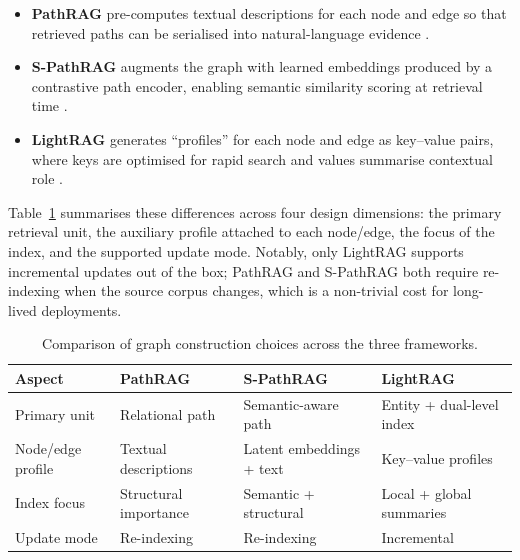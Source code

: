 \documentclass[12pt,a4paper,oneside]{report}
\begin{document}
\begin{itemize}[leftmargin=2em,itemsep=2pt]
    \item \textbf{PathRAG} pre-computes textual descriptions for each node
          and edge so that retrieved paths can be serialised into
          natural-language evidence \citep{chen2025pathrag}.
    \item \textbf{S-PathRAG} augments the graph with learned embeddings
          produced by a contrastive path encoder, enabling semantic
          similarity scoring at retrieval time \citep{fu2026spathrag}.
    \item \textbf{LightRAG} generates ``profiles'' for each node and edge as
          key--value pairs, where keys are optimised for rapid search and
          values summarise contextual role \citep{guo2025lightrag}.
\end{itemize}

Table~\ref{tab:graph_construction} summarises these differences across
four design dimensions: the primary retrieval unit, the auxiliary
profile attached to each node/edge, the focus of the index, and the
supported update mode. Notably, only LightRAG supports incremental
updates out of the box; PathRAG and S-PathRAG both require re-indexing
when the source corpus changes, which is a non-trivial cost for
long-lived deployments.

\begin{table}[htbp]
    \centering
    \caption{Comparison of graph construction choices across the three
             frameworks.}
    \label{tab:graph_construction}
    \small
    \begin{tabularx}{\textwidth}{@{}lXXX@{}}
        \toprule
        \textbf{Aspect} & \textbf{PathRAG} & \textbf{S-PathRAG} & \textbf{LightRAG} \\
        \midrule
        Primary unit     & Relational path        & Semantic-aware path         & Entity + dual-level index \\
        Node/edge profile& Textual descriptions   & Latent embeddings + text    & Key--value profiles \\
        Index focus      & Structural importance  & Semantic + structural       & Local + global summaries \\
        Update mode      & Re-indexing            & Re-indexing                 & Incremental \\
        \bottomrule
    \end{tabularx}
\end{table}
\end{document}
